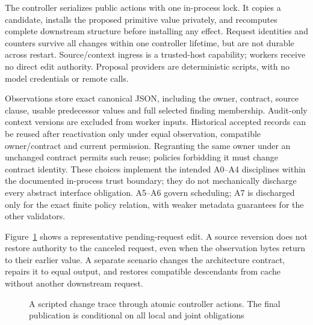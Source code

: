 \documentclass[pdflatex,sn-mathphys-num]{sn-jnl}
\theoremstyle{thmstyleone}
\theoremstyle{thmstylethree}
\theoremstyle{thmstyletwo}
\begin{document}
The controller serializes public actions with one in-process lock. It copies a candidate, installs the proposed primitive value privately, and recomputes complete downstream structure before installing any effect. Request identities and counters survive all changes within one controller lifetime, but are not durable across restart. Source/context ingress is a trusted-host capability; workers receive no direct edit authority. Proposal providers are deterministic scripts, with no model credentials or remote calls.

Observations store exact canonical JSON, including the owner, contract, source clause, usable predecessor values and full selected finding membership. Audit-only context versions are excluded from worker inputs. Historical accepted records can be reused after reactivation only under equal observation, compatible owner/contract and current permission. Regranting the same owner under an unchanged contract permits such reuse; policies forbidding it must change contract identity. These choices implement the intended A0--A4 disciplines within the documented in-process trust boundary; they do not mechanically discharge every abstract interface obligation. A5--A6 govern scheduling; A7 is discharged only for the exact finite policy relation, with weaker metadata guarantees for the other validators.

Figure~\ref{fig:case-trace} shows a representative pending-request edit. A source reversion does not restore authority to the canceled request, even when the observation bytes return to their earlier value. A separate scenario changes the architecture contract, repairs it to equal output, and restores compatible descendants from cache without another downstream request.
\begin{figure}[tb]
\centering
{}
\caption{A scripted change trace through atomic controller actions. The final publication is conditional on all local and joint obligations}\label{fig:case-trace}
\end{figure}
\end{document}
